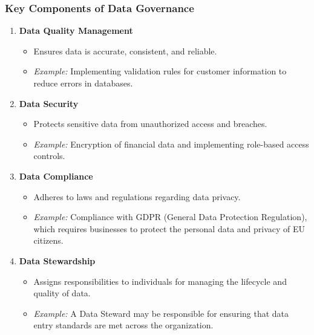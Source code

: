\documentclass[aspectratio=169]{beamer}
\begin{document}
\begin{frame}[fragile]
    \frametitle{Key Components of Data Governance}
    \begin{enumerate}
        \item \textbf{Data Quality Management}
            \begin{itemize}
                \item Ensures data is accurate, consistent, and reliable.
                \item \textit{Example:} Implementing validation rules for customer information to reduce errors in databases.
            \end{itemize}
        \item \textbf{Data Security}
            \begin{itemize}
                \item Protects sensitive data from unauthorized access and breaches.
                \item \textit{Example:} Encryption of financial data and implementing role-based access controls.
            \end{itemize}
        \item \textbf{Data Compliance}
            \begin{itemize}
                \item Adheres to laws and regulations regarding data privacy.
                \item \textit{Example:} Compliance with GDPR (General Data Protection Regulation), which requires businesses to protect the personal data and privacy of EU citizens.
            \end{itemize}
        \item \textbf{Data Stewardship}
            \begin{itemize}
                \item Assigns responsibilities to individuals for managing the lifecycle and quality of data.
                \item \textit{Example:} A Data Steward may be responsible for ensuring that data entry standards are met across the organization.
            \end{itemize}
    \end{enumerate}
\end{frame}
\end{document}
